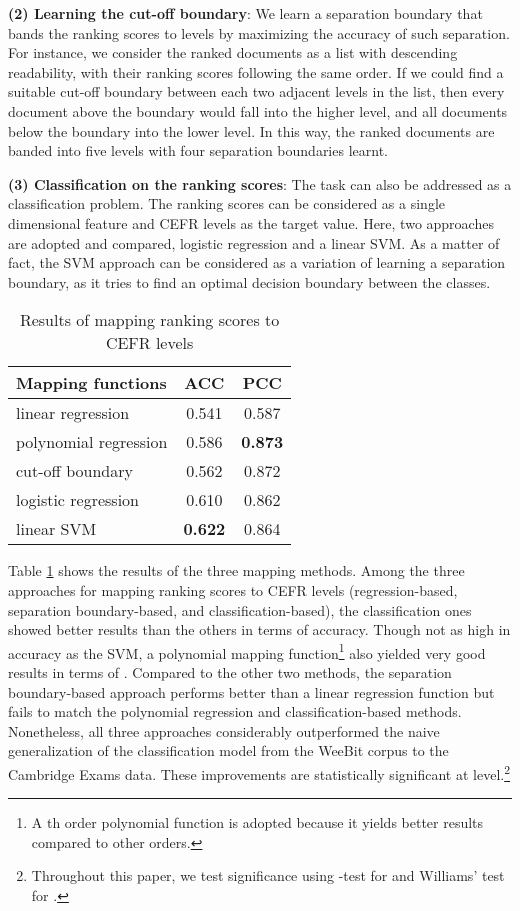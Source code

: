 \documentclass[11pt,letterpaper]{article}
\begin{document}
		{\bf (2) Learning the cut-off boundary}: We learn a separation boundary that bands the ranking scores to levels by maximizing the accuracy of such separation. For instance, we consider the ranked documents as a list with descending readability, with their ranking scores following the same order. If we could find a suitable cut-off boundary between each two adjacent levels in the list, then every document above the boundary would fall into the higher level, and all documents below the boundary into the lower level. In this way, the ranked documents are banded into five levels with four separation boundaries learnt. 
		
		{\bf (3) Classification on the ranking scores}: The task can also be addressed as a classification problem. The ranking scores can be considered as a single dimensional feature and CEFR levels as the target value. Here, two approaches are adopted and compared, logistic regression and a linear SVM. As a matter of fact, the SVM approach can be considered as a variation of learning a separation boundary, as it tries to find an optimal decision boundary between the classes. 
		
		\begin{table}[t]
			\centering
			\small
			\begin{tabular}{l|c|c}
				\hline
				Mapping functions & ACC & PCC\\
				\hline \hline
				linear regression & 0.541 & 0.587\\
				\hline
				polynomial regression  & 0.586 & \textbf{0.873} \\
				\hline
				cut-off boundary & 0.562 & 0.872\\
				\hline
				logistic regression & 0.610 & 0.862\\
				\hline
				linear SVM & \textbf{0.622} & 0.864\\
				\hline
			\end{tabular}
			\caption{Results of mapping ranking scores to CEFR levels}
			\label{map}

		\end{table}
		
		Table \ref{map} shows the results of the three mapping methods.  Among the three approaches for mapping ranking scores to CEFR levels (regression-based, separation boundary-based, and classification-based), the classification ones showed better results than the others in terms of accuracy. Though not as high in accuracy as the SVM, a polynomial mapping function\footnote{
		A th order polynomial function is adopted because it yields better results compared to other orders.} also yielded very good results in terms of . Compared to the other two methods, the separation boundary-based approach performs better than a linear regression function but fails to match the polynomial regression and classification-based methods. Nonetheless, all three approaches considerably outperformed the naive generalization of the classification model from the WeeBit corpus to the Cambridge Exams data. These improvements are statistically significant at  level.\footnote{Throughout this paper, we test  significance using -test for  and Williams' test \cite{williams1959regression} for .}
		
\end{document}
